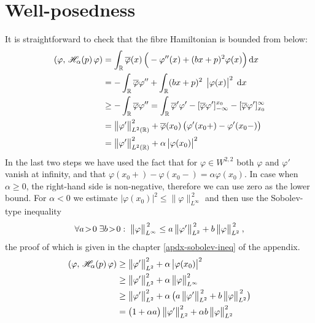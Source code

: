 \section{Well-posedness}
It is straightforward to check that the fibre Hamiltonian is bounded from below:
\begin{align*}
    (\varphi, \, \mathscr{H}_\alpha(p) \, \varphi)
    &= \int_{\mathbb{R}} \overline{\varphi}(x) \, \Big( -\varphi''(x) + (b x + p)^2 \varphi(x) \Big) \, \mathrm{d}x \,
    \\
    &= -\int_{\mathbb{R}} \overline{\varphi} \varphi''
    + \int_{\mathbb{R}} (b x + p)^2 \;\, \big|\varphi(x)\big|^2 \; \, \mathrm{d}x \,
    \\
    &\geq -\int_{\mathbb{R}} \overline{\varphi} \varphi''
    = \int_{\mathbb{R}} \overline{\varphi}' \varphi'
    - [\overline{\varphi}\varphi']_{-\infty}^{x_0}
    - [\overline{\varphi}\varphi']_{x_0}^{\infty}
    \\
    &= \big\lVert \varphi' \big\rVert_{L^2(\mathbb{R})}^2
    + \overline{\varphi}(x_0)
    \, \big( \varphi'(x_0+) - \varphi'(x_0-) \big)
    \\
    &= \big\lVert \varphi' \big\rVert_{L^2(\mathbb{R})}^2
    + \alpha \, \big|\varphi(x_0)\big|^2
\end{align*}
In the last two steps we have used the fact that for $\varphi \in W^{2,2}$ both $\varphi$ and $\varphi'$ vanish at infinity, and that $\varphi(x_0+)-\varphi(x_0-) = \alpha \varphi(x_0)$. In case when $\alpha\geq0$, the right-hand side is non-negative, therefore we can use zero as the lower bound. For $\alpha<0$ we estimate $|\varphi(x_0)|^2 \leq \lVert\varphi\rVert_{L^\infty}^{\,2}$ and then use the Sobolev-type inequality
\begin{equation*}
    \forall a\!>\!0 \; \exists b\!>\!0: \; \big\lVert \varphi \big\rVert_{L^\infty}^{\,2} \leq a \, \big\lVert \varphi' \big\rVert_{L^2}^{\,2} + b \, \big\lVert \varphi \big\rVert_{L^2}^{\,2} \:,
\end{equation*}
the proof of which is given in the chapter \ref{apdx-sobolev-ineq} of the appendix.
\begin{align*}
    (\varphi, \, \mathscr{H}_\alpha(p) \, \varphi)
    &\geq \big\lVert \varphi' \big\rVert_{L^2}^2
    + \alpha \, \big|\varphi(x_0)\big|^2
    \\
    &\geq \big\lVert \varphi' \big\rVert_{L^2}^2
    + \alpha \, \big\lVert \varphi \big\rVert_{L^\infty}^2
    \\
    &\geq \big\lVert \varphi' \big\rVert_{L^2}^2
    + \alpha \, \big(
        a \, \big\lVert \varphi' \big\rVert_{L^2}^{\,2} + b \, \big\lVert \varphi \big\rVert_{L^2}^{\,2}
    \big)
    \\
    &= \big( 1 + \alpha a \big) \, \big\lVert \varphi' \big\rVert_{L^2}^2
    +\alpha b \, \big\lVert \varphi \big\rVert_{L^2}^2
\end{align*}
